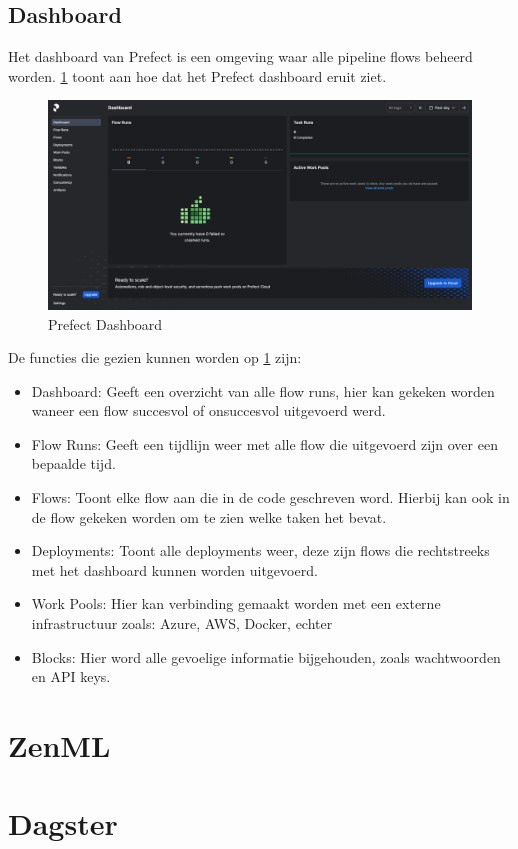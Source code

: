 \subsection{Dashboard}
Het dashboard van Prefect is een omgeving waar alle pipeline flows beheerd worden. \ref{fig:Prefect_Dashboard} toont aan hoe dat het Prefect dashboard eruit ziet.
\begin{figure}[h]
    \includegraphics[width=\linewidth]{graphics/Prefect_dashboard.PNG}
    \caption{Prefect Dashboard}
    \label{fig:Prefect_Dashboard}
\end{figure}
De functies die gezien kunnen worden op \ref{fig:Prefect_Dashboard} zijn:
\begin{itemize}
    \item Dashboard: Geeft een overzicht van alle flow runs, hier kan gekeken worden waneer een flow succesvol of onsuccesvol uitgevoerd werd.
    \item Flow Runs: Geeft een tijdlijn weer met alle flow die uitgevoerd zijn over een bepaalde tijd.
    \item Flows: Toont elke flow aan die in de code geschreven word. Hierbij kan ook in de flow gekeken worden om te zien welke taken het bevat.
    \item Deployments: Toont alle deployments weer, deze zijn flows die rechtstreeks met het dashboard kunnen worden uitgevoerd.
    \item Work Pools: Hier kan verbinding gemaakt worden met een externe infrastructuur zoals: Azure, AWS, Docker, echter
    \item Blocks: Hier word alle gevoelige informatie bijgehouden, zoals wachtwoorden en API keys.
\end{itemize}
\section{ZenML}

\section{Dagster}



